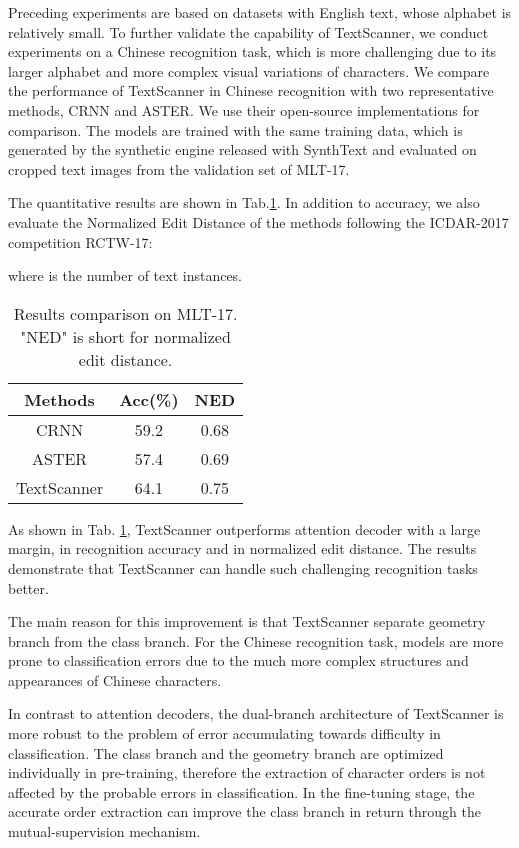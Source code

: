 \documentclass[letterpaper]{article} \usepackage{aaai20}  \usepackage{times}  \usepackage{helvet} \usepackage{courier}  \usepackage[hyphens]{url}  \usepackage{graphicx} \urlstyle{rm} \def\UrlFont{\rm}  \usepackage{graphicx}  \frenchspacing  \setlength{\pdfpagewidth}{8.5in}  \setlength{\pdfpageheight}{11in}
\begin{document}
Preceding experiments are based on datasets with English text, whose alphabet is relatively small. To further validate the capability of TextScanner, we conduct experiments on a Chinese recognition task, which is more challenging due to its larger alphabet and more complex visual variations of characters.
We compare the performance of TextScanner in Chinese recognition with two representative methods, CRNN\cite{shi2017end} and ASTER\cite{aster}. We use their open-source implementations for comparison. The models are trained with the same training data, which is generated by the synthetic engine released with SynthText and evaluated on cropped text images from the validation set of MLT-17.

The quantitative results are shown in Tab.\ref{tab:Chinese}. In addition to accuracy, we also evaluate the Normalized Edit Distance of the methods following the ICDAR-2017 competition RCTW-17\cite{shi2017icdar2017}:

where  is the number of text instances.

\begin{table}[!t]
\centering
    \begin{tabular}{|c|c|c|}
    \hline
    \textbf{Methods} & Acc(\%) & NED \\
    \hline
    CRNN\tiny\cite{shi2017end} & 59.2 & 0.68 \\
    ASTER\tiny\cite{aster} & 57.4 & 0.69 \\
    TextScanner & 64.1 & 0.75 \\
    \hline
    \end{tabular}
\caption{Results comparison on MLT-17. "NED" is short for normalized edit distance.}
\label{tab:Chinese}
\end{table}

As shown in Tab. \ref{tab:Chinese}, TextScanner outperforms attention decoder with a large margin,  in recognition accuracy and  in normalized edit distance. The results demonstrate that TextScanner can handle such challenging recognition tasks better.

The main reason for this improvement is that TextScanner separate geometry branch from the class branch. For the Chinese recognition task, models are more prone to classification errors due to the much more complex structures and appearances of Chinese characters.

In contrast to attention decoders, the dual-branch architecture of TextScanner is more robust to the problem of error accumulating towards difficulty in classification. The class branch and the geometry branch are optimized individually in pre-training, therefore the extraction of character orders is not affected by the probable errors in classification. In the fine-tuning stage, the accurate order extraction can improve the class branch in return through the mutual-supervision mechanism.
\end{document}

